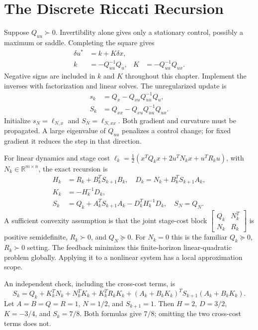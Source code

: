 \section{The Discrete Riccati Recursion}

Suppose $Q_{uu}\succ0$. Invertibility alone gives only a stationary control,
possibly a maximum or saddle. Completing the square gives
\begin{align}
\delta u^*&=k+K\delta x,\label{eq:ch5:feedback-affine}\\
k&=-Q_{uu}^{-1}Q_u,&K&=-Q_{uu}^{-1}Q_{ux}.\label{eq:ch5:gain-def}
\end{align}
Negative signs are included in $k$ and $K$ throughout this chapter. Implement
the inverses with factorization and linear solves. The unregularized update is
\begin{align}
s_k&=Q_x-Q_{xu}Q_{uu}^{-1}Q_u,\\
S_k&=Q_{xx}-Q_{xu}Q_{uu}^{-1}Q_{ux}.\label{eq:ch5:S-def}
\end{align}
Initialize $s_N=\ell_{N,x}$ and $S_N=\ell_{N,xx}$. Both gradient and
curvature must be propagated. A large eigenvalue of $Q_{uu}$ penalizes a
control change; for fixed gradient it reduces the step in that direction.

For linear dynamics and stage cost
$\ell_k=\tfrac12(x^TQ_kx+2u^TN_kx+u^TR_ku)$, with
$N_k\in\mathbb R^{m\times n}$, the exact recursion is
\begin{align}
H_k&=R_k+B_k^TS_{k+1}B_k,\quad D_k=N_k+B_k^TS_{k+1}A_k,\\
K_k&=-H_k^{-1}D_k,\\
S_k&=Q_k+A_k^TS_{k+1}A_k-D_k^TH_k^{-1}D_k,\quad S_N=Q_N.
\label{eq:ch5:riccati-full}
\end{align}
A sufficient convexity assumption is that the joint stage-cost block
$\left[\begin{smallmatrix}Q_k&N_k^T\\N_k&R_k\end{smallmatrix}\right]$
is positive semidefinite, $R_k\succ0$, and $Q_N\succeq0$. For $N_k=0$
this is the familiar $Q_k\succeq0$, $R_k\succ0$ setting. The feedback
minimizes this finite-horizon linear-quadratic problem globally. Applying it
to a nonlinear system has a local approximation scope.

An independent check, including the cross-cost terms, is
\begin{equation}
S_k=Q_k+K_k^TN_k+N_k^TK_k+K_k^TR_kK_k+
(A_k+B_kK_k)^TS_{k+1}(A_k+B_kK_k).
\label{eq:ch5:riccati-alt}
\end{equation}
Let $A=B=Q=R=1$, $N=1/2$, and $S_{k+1}=1$. Then
$H=2$, $D=3/2$, $K=-3/4$, and $S_k=7/8$. Both formulas give $7/8$;
omitting the two cross-cost terms does not.

